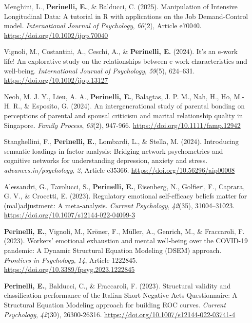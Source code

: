 \documentclass[hidelinks, letterpaper,10pt]{article} %
\begin{document}
\begin{etaremune}
\item Menghini, L., \textbf{Perinelli, E.}, \& Balducci, C. (2025). Manipulation of Intensive Longitudinal Data: A tutorial in R with applications on the Job Demand-Control model. \textit{International Journal of Psychology}, \textit{60}(2), Article e70040. \url{https://doi.org/10.1002/ijop.70040}

\item Vignoli, M., Costantini, A., Ceschi, A., \& \textbf{Perinelli, E.} (2024). It’s an e-work life! An explorative study on the relationships between e-work characteristics and well-being. \textit{International Journal of Psychology}, \textit{59}(5), 624–631. \url{https://doi.org/10.1002/ijop.13127}

\item Neoh, M. J. Y., Lieu, A. A., \textbf{Perinelli, E.}, Balagtas, J. P. M., Nah, H., Ho, M.-H. R., \& Esposito, G. (2024). An intergenerational study of parental bonding on perceptions of parental and spousal criticism and marital relationship quality in Singapore. \textit{Family Process}, \textit{63}(2), 947-966. \url{https://doi.org/10.1111/famp.12942}

\item Stanghellini, F., \textbf{Perinelli, E.}, Lombardi, L., \& Stella, M. (2024). Introducing semantic loadings in factor analysis: Bridging network psychometrics and cognitive networks for understanding depression, anxiety and stress. \textit{advances.in/psychology}, \textit{2}, Article e35366. \url{https://doi.org/10.56296/aip00008}

\item Alessandri, G., Tavolucci, S., \textbf{Perinelli, E.}, Eisenberg, N., Golfieri, F., Caprara, G. V., \& Crocetti, E. (2023). Regulatory emotional self-efficacy beliefs matter for (mal)adjustment: A meta-analysis. \textit{Current Psychology}, \textit{42}(35), 31004–31023. \url{https://doi.org/10.1007/s12144-022-04099-3}

\item \textbf{Perinelli, E.}, Vignoli, M., Kröner, F., Müller, A., Genrich, M., \& Fraccaroli, F. (2023). Workers' emotional exhaustion and mental well-being over the COVID-19 pandemic: A Dynamic Structural Equation Modeling (DSEM) approach. \textit{Frontiers in Psychology}, \textit{14}, Article 1222845. \url{https://doi.org/10.3389/fpsyg.2023.1222845}

\item \textbf{Perinelli, E.}, Balducci, C., \& Fraccaroli, F. (2023). Structural validity and classification performance of the Italian Short Negative Acts Questionnaire: A Structural Equation Modeling approach for building ROC curves. \textit{Current Psychology}, \textit{42}(30), 26300-26316. \url{https://doi.org/10.1007/s12144-022-03741-4}


\end{etaremune}
\end{document}
